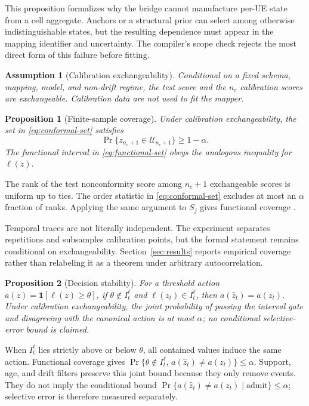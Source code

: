 \documentclass[10pt,journal,twoside]{IEEEtran}
\newtheorem{proposition}{Proposition}
\newtheorem{assumption}{Assumption}
\newcommand{\cU}{\mathcal{U}}
\newcommand{\ind}{\mathbf{1}}
\begin{document}
This proposition formalizes why the bridge cannot manufacture per-UE state from a cell aggregate. Anchors or a structural prior can select among otherwise indistinguishable states, but the resulting dependence must appear in the mapping identifier and uncertainty. The compiler's scope check rejects the most direct form of this failure before fitting.

\begin{assumption}[Calibration exchangeability]
Conditional on a fixed schema, mapping, model, and non-drift regime, the test score and the $n_c$ calibration scores are exchangeable. Calibration data are not used to fit the mapper.
\end{assumption}

\begin{proposition}[Finite-sample coverage]
Under calibration exchangeability, the set in \eqref{eq:conformal-set} satisfies
\begin{equation}
\Pr\{z_{n_c+1}\in\cU_{n_c+1}\}\ge 1-\alpha.
\label{eq:coverage}
\end{equation}
The functional interval in \eqref{eq:functional-set} obeys the analogous inequality for $\ell(z)$.
\end{proposition}
\begin{IEEEproof}
The rank of the test nonconformity score among $n_c+1$ exchangeable scores is uniform up to ties. The order statistic in \eqref{eq:conformal-set} excludes at most an $\alpha$ fraction of ranks. Applying the same argument to $S_j$ gives functional coverage \cite{vovk2022algorithmic,angelopoulos2023conformal}.
\end{IEEEproof}

Temporal traces are not literally independent. The experiment separates repetitions and subsamples calibration points, but the formal statement remains conditional on exchangeability. Section~\ref{sec:results} reports empirical coverage rather than relabeling it as a theorem under arbitrary autocorrelation.

\begin{proposition}[Decision stability]\label{prop:stability}
For a threshold action $a(z)=\ind[\ell(z)\ge\theta]$, if $\theta\notin I_t^\ell$ and $\ell(z_t)\in I_t^\ell$, then $a(\hat z_t)=a(z_t)$. Under calibration exchangeability, the joint probability of passing the interval gate and disagreeing with the canonical action is at most $\alpha$; no conditional selective-error bound is claimed.
\end{proposition}
\begin{IEEEproof}
When $I_t^\ell$ lies strictly above or below $\theta$, all contained values induce the same action. Functional coverage gives
$\Pr\{\theta\notin I_t^\ell,\,a(\hat z_t)\ne a(z_t)\}\le\alpha$.
Support, age, and drift filters preserve this joint bound because they only remove events. They do not imply the conditional bound $\Pr\{a(\hat z_t)\ne a(z_t)\mid\text{admit}\}\le\alpha$; selective error is therefore measured separately.
\end{IEEEproof}
\end{document}
